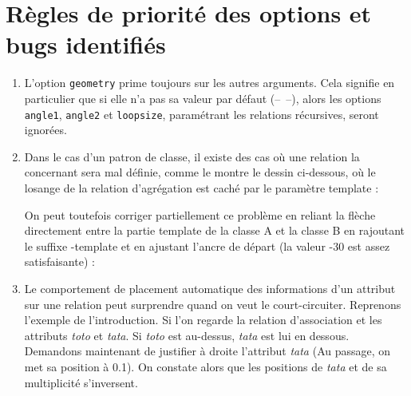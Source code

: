 \documentclass[a4paper,11pt]{report}
\newcommand{\inputTikZ}[1]{%
  }%
\newcommand{\inputTikZ}[1]{%
    \texttt{[image: fig/\#1.pdf]}%
  }%
\begin{document}
\section{Règles de priorité des options et bugs identifiés}\label{s.classbug}

\begin{enumerate}
\item L'option {\tt geometry} prime toujours sur les autres arguments. Cela signifie en particulier que si elle n'a pas sa valeur par défaut (--~--), alors les options {\tt angle1}, {\tt angle2} et {\tt loopsize}, paramétrant les relations récursives, seront ignorées.
\item Dans le cas d'un patron de classe, il existe des cas où une relation la concernant sera mal définie, comme le montre le dessin ci-dessous, où le losange de la relation d'agrégation est caché par le paramètre template :

\begin{minipage}{0.6\textwidth}

\end{minipage}
\begin{minipage}{0.4\textwidth}
\begin{center}
\inputTikZ{figure38}
\end{center}
\end{minipage}

\medskip

On peut toutefois corriger partiellement ce problème en reliant la flèche directement entre la partie template de la classe A et la classe B en rajoutant le suffixe -template et en ajustant l'ancre de départ (la valeur -30 est assez satisfaisante) : 

\medskip

\begin{minipage}{0.6\textwidth}

\end{minipage}
\begin{minipage}{0.4\textwidth}
\begin{center}
\inputTikZ{figure39}
\end{center}
\end{minipage}

\medskip

\item Le comportement de placement automatique des informations d'un attribut sur une relation peut surprendre quand on veut le court-circuiter. Reprenons l'exemple de l'introduction. Si l'on regarde la relation d'association et les attributs {\it toto} et {\it tata}. Si {\it toto} est au-dessus, {\it tata} est lui en dessous. Demandons maintenant de justifier à droite l'attribut {\it tata} (Au passage, on met sa position à 0.1). On constate alors que les positions de {\it tata} et de sa multiplicité s'inversent.

\begin{center}
\inputTikZ{figure40}
\end{center}

\end{enumerate}
\end{document}
